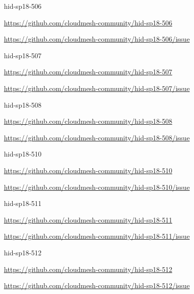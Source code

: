 \begin{IU}

hid-sp18-506

\url{https://github.com/cloudmesh-community/hid-sp18-506}

\url{https://github.com/cloudmesh-community/hid-sp18-506/issue}

\end{IU}


\begin{IU}

hid-sp18-507

\url{https://github.com/cloudmesh-community/hid-sp18-507}

\url{https://github.com/cloudmesh-community/hid-sp18-507/issue}

\end{IU}


\begin{IU}

hid-sp18-508

\url{https://github.com/cloudmesh-community/hid-sp18-508}

\url{https://github.com/cloudmesh-community/hid-sp18-508/issue}

\end{IU}


\begin{IU}

hid-sp18-510

\url{https://github.com/cloudmesh-community/hid-sp18-510}

\url{https://github.com/cloudmesh-community/hid-sp18-510/issue}

\end{IU}


\begin{IU}

hid-sp18-511

\url{https://github.com/cloudmesh-community/hid-sp18-511}

\url{https://github.com/cloudmesh-community/hid-sp18-511/issue}

\end{IU}


\begin{IU}

hid-sp18-512

\url{https://github.com/cloudmesh-community/hid-sp18-512}

\url{https://github.com/cloudmesh-community/hid-sp18-512/issue}

\end{IU}


